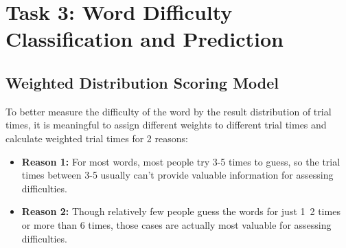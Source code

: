 \section{Task 3: Word Difficulty Classification and Prediction}
\subsection{Weighted Distribution Scoring Model}
To better measure the difficulty of the word by the result distribution of trial times, it is meaningful to assign different weights to different trial times and calculate weighted trial times for 2 reasons:
\begin{itemize}
    \item\textbf{Reason 1: } For most words, most people try 3-5 times to guess, so the trial times between 3-5 usually can't provide valuable information for assessing difficulties.
    
    \item\textbf{Reason 2: } Though relatively few people guess the words for just 1~2 times or more than 6 times, those cases are actually most valuable for assessing difficulties.
\end{itemize}

